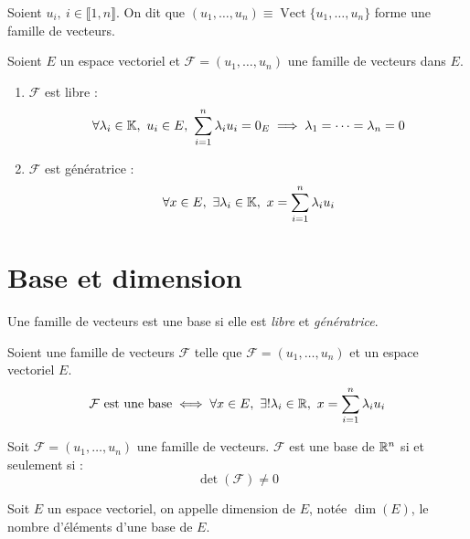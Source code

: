 \begin{nomenclature}
    Soient $u_i,\ i \in \llbracket 1, n \rrbracket$. On dit que $(u_1, \ldots, u_n) \equiv \operatorname{Vect}\{ u_1, \ldots, u_n \}$ forme une famille de vecteurs.
\end{nomenclature}

\begin{definition}
	Soient $E$ un espace vectoriel et $\mathcal{F} = (u_1, \ldots, u_n)$ une famille de vecteurs dans $E$.
	\begin{enumerate}
		\item $\mathcal{F}$ est libre :
		\begin{align*}
			\forall \lambda_i \in \mathbb{K},\ u_i \in E,\ \sum_{i = 1}^n \lambda_i u_i = 0_E \implies \lambda_1 = \cdots = \lambda_n = 0
		\end{align*}
		\item $\mathcal{F}$ est génératrice :
		\begin{align*}
			\forall x \in E,\ \exists \lambda_i \in \mathbb{K},\ x = \sum_{i = 1}^n \lambda_i u_i 
		\end{align*}
	\end{enumerate}
\end{definition}

\section{Base et dimension}
\begin{definition}[Base]
	Une famille de vecteurs est une base si elle est \emph{libre} et \emph{génératrice}.
\end{definition}

\begin{proposition}
	Soient une famille de vecteurs $\mathcal{F}$ telle que $\mathcal{F} = (u_1, \ldots, u_n)$ et un espace vectoriel $E$.
	\[ 
	\mathcal{F} \text{ est une base} \iff 
	\forall x \in E,\ \exists ! \lambda_i \in \mathbb{R},\ x = \sum_{i = 1}^n \lambda_i u_i
	\]
\end{proposition}

\begin{proposition}
	Soit $\mathcal{F} = (u_1, \ldots, u_n)$ une famille de vecteurs. $\mathcal{F}$ est une base de $\mathbb{R}^n$ si et seulement si :
	\[ \det(\mathcal{F}) \neq 0 \]
\end{proposition}

\begin{definition}
	Soit $E$ un espace vectoriel, on appelle dimension de $E$, notée $\dim(E)$, le nombre d'éléments d'une base de $E$. 
\end{definition}


